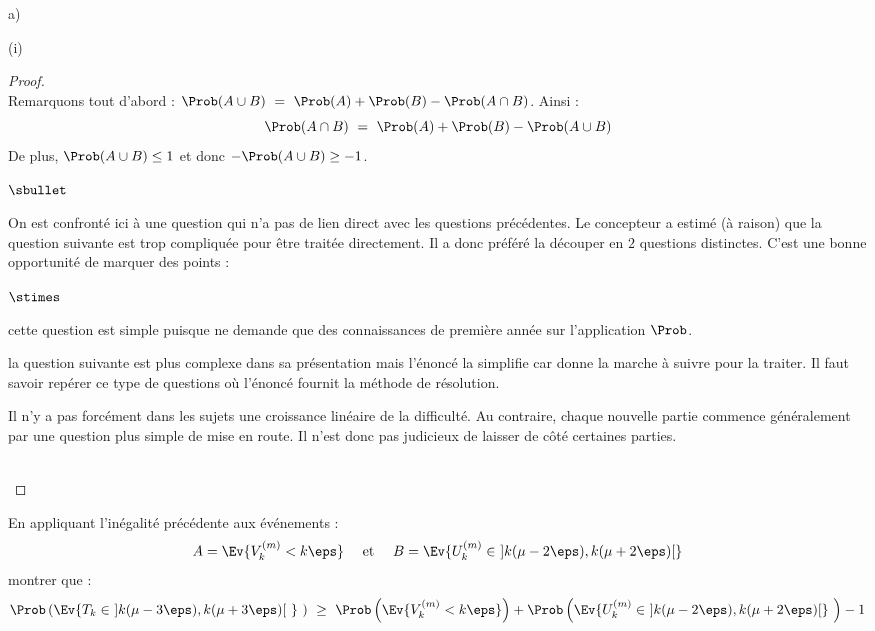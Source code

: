 \documentclass[11pt]{article}%
\begin{document}
\begin{liste}{a)}
\begin{nonoliste}{(i)}
    \begin{proof}~\\%
      Remarquons tout d'abord : $\Prob(A \cup B) \ = \ \Prob(A) +
      \Prob(B) - \Prob(A \cap B)$. Ainsi :
      \[
      \Prob(A \cap B) \ = \ \Prob(A) + \Prob(B) - \Prob(A \cup B)
      \]
      De plus, $\Prob(A \cup B) \leq 1$ et donc $-\Prob(A \cup B) \geq
      -1$.%
      \begin{remarkL}{.97}%
        \begin{noliste}{$\sbullet$}
        \item On est confronté ici à une question qui n'a pas de lien
          direct avec les questions précédentes. Le concepteur a
          estimé (à raison) que la question suivante est trop
          compliquée pour être traitée directement. Il a donc préféré
          la découper en $2$ questions distinctes. C'est une bonne
          opportunité de marquer des points : 
          \begin{noliste}{$\stimes$}
          \item cette question  est simple puisque ne
            demande que des connaissances de première année sur
            l'application $\Prob$.
          \item la question suivante  est plus complexe
            dans sa présentation mais l'énoncé la simplifie car donne
            la marche à suivre pour la traiter. Il faut savoir repérer
            ce type de questions où l'énoncé fournit la méthode de
            résolution.
          \end{noliste}
        \item Il n'y a pas forcément dans les sujets une croissance
          linéaire de la difficulté. Au contraire, chaque nouvelle
          partie commence généralement par une question plus simple de
          mise en route. Il n'est donc pas judicieux de laisser de
          côté certaines parties.
        \end{noliste}
      \end{remarkL}~\\[-1.2cm]
    \end{proof}


    \newpage


  \item En appliquant l'inégalité précédente aux événements :
    \[
    A = \Ev{V_{k}^{(m)} < k \eps} \quad \text{ et } \quad B =
    \Ev{U_{k}^{(m)} \in \ ] k(\mu - 2 \eps), k(\mu + 2 \eps)[ }
    \]
    montrer que :
    \[
    \Prob\left(\Ev{T_{k} \in \ ]k(\mu - 3 \eps), k(\mu + 3 \eps)[ \ }
      \ \right) \ \geq \ \Prob\left(\Ev{ V_{k}^{(m)} < k \eps}\right)
    + \Prob\left(\Ev{U_{k}^{(m)} \in \ ]k(\mu - 2 \eps), k(\mu + 2
        \eps)[} \ \right) - 1
    \]


\end{nonoliste}
\end{liste}
\end{document}
